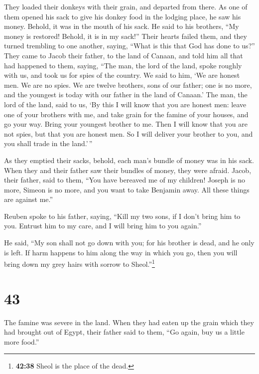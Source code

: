  They loaded their donkeys with their grain, and departed
from there.  As one of them opened his sack to give his
donkey food in the lodging place, he saw his money. Behold, it was in
the mouth of his sack.  He said to his brothers, ``My
money is restored! Behold, it is in my sack!'' Their hearts failed them,
and they turned trembling to one another, saying, ``What is this that
God has done to us?''  They came to Jacob their father,
to the land of Canaan, and told him all that had happened to them,
saying,  ``The man, the lord of the land, spoke roughly
with us, and took us for spies of the country.  We said
to him, `We are honest men. We are no spies.  We are
twelve brothers, sons of our father; one is no more, and the youngest is
today with our father in the land of Canaan.'  The man,
the lord of the land, said to us, `By this I will know that you are
honest men: leave one of your brothers with me, and take grain for the
famine of your houses, and go your way.  Bring your
youngest brother to me. Then I will know that you are not spies, but
that you are honest men. So I will deliver your brother to you, and you
shall trade in the land.'\,''

 As they emptied their sacks, behold, each man's bundle
of money was in his sack. When they and their father saw their bundles
of money, they were afraid.  Jacob, their father, said to
them, ``You have bereaved me of my children! Joseph is no more, Simeon
is no more, and you want to take Benjamin away. All these things are
against me.''

 Reuben spoke to his father, saying, ``Kill my two sons,
if I don't bring him to you. Entrust him to my care, and I will bring
him to you again.''

 He said, ``My son shall not go down with you; for his
brother is dead, and he only is left. If harm happens to him along the
way in which you go, then you will bring down my grey hairs with sorrow
to Sheol.''\footnote{\textbf{42:38} Sheol is the place of the dead.}

\hypertarget{section-42}{%
\section{43}\label{section-42}}

 The famine was severe in the land.  When
they had eaten up the grain which they had brought out of Egypt, their
father said to them, ``Go again, buy us a little more food.''


